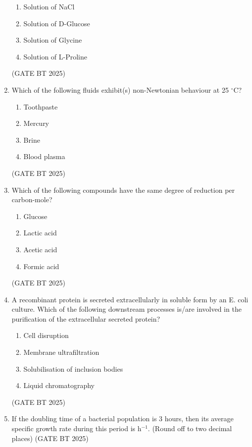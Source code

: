 \documentclass[journal,12pt,onecolumn]{IEEEtran}
\theoremstyle{remark}
\begin{document}
\begin{enumerate}
\begin{enumerate}
    \item Solution of NaCl
    \item Solution of D-Glucose
    \item Solution of Glycine
    \item Solution of L-Proline
\end{enumerate}  
\hfill (GATE BT 2025)

\item Which of the following fluids exhibit(s) non-Newtonian behaviour at 25 $^\circ$C?  

\begin{enumerate}
    \item Toothpaste
    \item Mercury
    \item Brine
    \item Blood plasma
\end{enumerate}  
\hfill (GATE BT 2025)

\item Which of the following compounds have the same degree of reduction per carbon-mole?  

\begin{enumerate}
    \item Glucose
    \item Lactic acid
    \item Acetic acid
    \item Formic acid
\end{enumerate}  
\hfill (GATE BT 2025)

\item A recombinant protein is secreted extracellularly in soluble form by an E. coli culture. Which of the following downstream processes is/are involved in the purification of the extracellular secreted protein?  

\begin{enumerate}
    \item Cell disruption
    \item Membrane ultrafiltration
    \item Solubilisation of inclusion bodies
    \item Liquid chromatography
\end{enumerate}  
\hfill (GATE BT 2025)

\item If the doubling time of a bacterial population is 3 hours, then its average specific growth rate during this period is h$^{-1}$.  
(Round off to two decimal places)  
\hfill (GATE BT 2025)


\end{enumerate}
\end{document}
